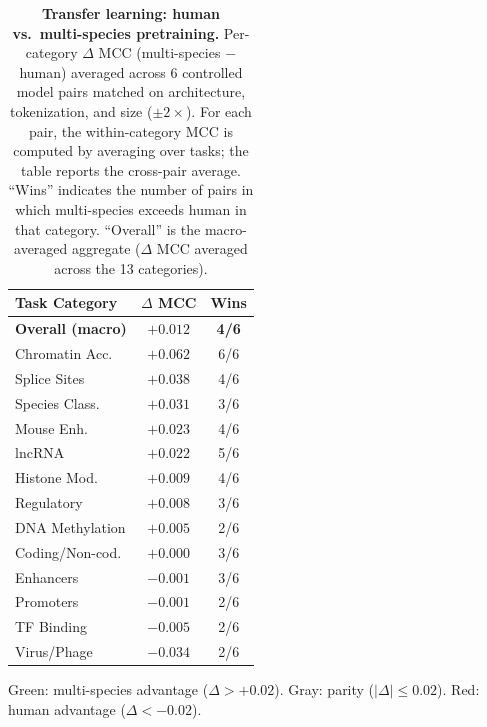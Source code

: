 \documentclass{llmxive}
\begin{document}
\begin{table}[!htbp]
\centering
\small
\begin{tabular}{lcc}
\toprule
\textbf{Task Category} & \textbf{$\Delta$ MCC} & \textbf{Wins} \\
\midrule
\textbf{Overall (macro)}   & $\mathbf{+0.012}$ & \textbf{4/6} \\
\midrule
\rowcolor{green!15} Chromatin Acc.    & $+0.062$ & 6/6 \\
\rowcolor{green!15} Splice Sites      & $+0.038$ & 4/6 \\
\rowcolor{green!15} Species Class.    & $+0.031$ & 3/6 \\
\rowcolor{green!15} Mouse Enh.        & $+0.023$ & 4/6 \\
\rowcolor{green!15} lncRNA            & $+0.022$ & 5/6 \\
\rowcolor{gray!10}  Histone Mod.      & $+0.009$ & 4/6 \\
\rowcolor{gray!10}  Regulatory        & $+0.008$ & 3/6 \\
\rowcolor{gray!10}  DNA Methylation   & $+0.005$ & 2/6 \\
\rowcolor{gray!10}  Coding/Non-cod.   & $+0.000$ & 3/6 \\
\rowcolor{gray!10}  Enhancers         & $-0.001$ & 3/6 \\
\rowcolor{gray!10}  Promoters         & $-0.001$ & 2/6 \\
\rowcolor{gray!10}  TF Binding        & $-0.005$ & 2/6 \\
\rowcolor{red!15}   Virus/Phage       & $-0.034$ & 2/6 \\
\bottomrule
\end{tabular}
\vspace{1mm}
\begin{flushleft}
\footnotesize
Green: multi-species advantage ($\Delta > +0.02$).
Gray: parity ($|\Delta| \leq 0.02$).
Red: human advantage ($\Delta < -0.02$).
\end{flushleft}
\caption{\textbf{Transfer learning: human vs.\ multi-species pretraining.}
Per-category $\Delta$ MCC (multi-species $-$ human) averaged across
6 controlled model pairs matched on architecture, tokenization, and
size ($\pm 2\times$). For each pair, the within-category MCC is
computed by averaging over tasks; the table reports the cross-pair
average. ``Wins'' indicates the number of pairs in which multi-species
exceeds human in that category. ``Overall'' is the macro-averaged
aggregate ($\Delta$ MCC averaged across the 13 categories).}
\label{tab:transfer_human_multi}
\end{table}
\end{document}
